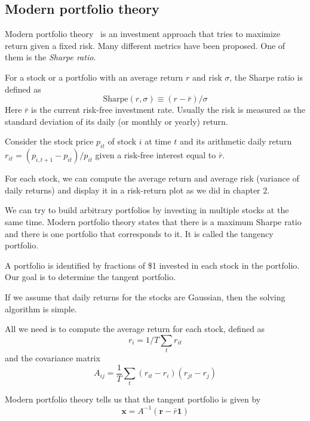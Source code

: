 \documentclass[justified, sixbynine]{tufte-book}
\theoremstyle{plain}%
\newtheorem * {corollary}{Corollary}
\theoremstyle{definition}
\theoremstyle{remark}
\newtheorem * {remark}{Remark}
\newtheorem * {note}{Note}
\begin{document}
\begin{fullwidth}
\goodbreak\subsection{Modern portfolio theory}


Modern portfolio theory~\cite{mpt} is an investment approach that tries to maximize return given a fixed risk. Many different metrics have been proposed. One of them is the {\it Sharpe ratio}.

For a stock or a portfolio with an average return $r$ and risk $\sigma$, the Sharpe ratio is defined as
\begin{equation}
\textrm{Sharpe}(r, \sigma) \equiv (r-\bar r)/\sigma
\end{equation}
Here $\bar r$ is the current risk-free investment rate. Usually the risk is measured as the standard deviation of its daily (or monthly or yearly) return.

Consider the stock price $p_{it}$ of stock $i$ at time $t$ and its arithmetic daily return
$r_{it}=(p_{i, t+1}-p_{it})/p_{it}$ given a risk-free interest equal to $\bar r$.

For each stock, we can compute the average return and average risk (variance of daily returns) and display it in a risk-return plot as we did in chapter 2.

We can try to build arbitrary portfolios by investing in multiple stocks at the same time. Modern portfolio theory states that there is a maximum Sharpe ratio and there is one portfolio that corresponds to it. It is called the tangency portfolio.

A portfolio is identified by fractions of \$1 invested in each stock in the portfolio. Our goal is to determine the tangent portfolio.

If we assume that daily returns for the stocks are Gaussian, then the solving algorithm is simple.

All we need is to compute the average return for each stock, defined as
\begin{equation}
r_i = 1/T \sum_t r_{it}
\end{equation}
and the covariance matrix
\begin{equation}
A_{ij} = \frac1T \sum_t (r_{it}-r_i)(r_{jt}-r_j)
\end{equation}

Modern portfolio theory tells us that the tangent portfolio is given by
\begin{equation}
\mathbf{x}=A^{-1} ( \mathbf{r}-\bar{r}\mathbf{1})
\end{equation}


\end{fullwidth}
\end{document}
